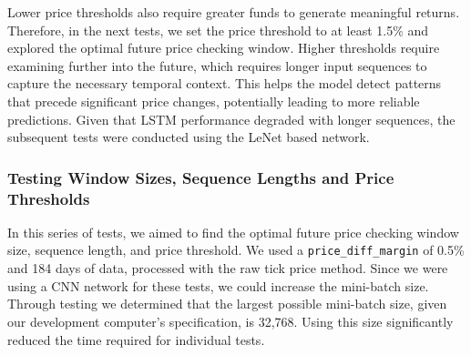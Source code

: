 \documentclass[a4paper,oneside,onecolumn,12pt]{book}
\begin{document}
		Lower price thresholds also require greater funds to generate meaningful returns. Therefore, in the next tests, we set the price threshold to at least 1.5\% and explored the optimal future price checking window. Higher thresholds require examining further into the future, which requires longer input sequences to capture the necessary temporal context. This helps the model detect patterns that precede significant price changes, potentially leading to more reliable predictions. Given that LSTM performance degraded with longer sequences, the subsequent tests were conducted using the LeNet based network.

		\subsubsection{Testing Window Sizes, Sequence Lengths and Price Thresholds}
		In this series of tests, we aimed to find the optimal future price checking window size, sequence length, and price threshold. We used a \texttt{price\_diff\_margin} of 0.5\% and 184 days of data, processed with the raw tick price method. Since we were using a CNN network for these tests, we could increase the mini-batch size. Through testing we determined that the largest possible mini-batch size, given our development computer's specification, is 32,768. Using this size significantly reduced the time required for individual tests.
\end{document}
